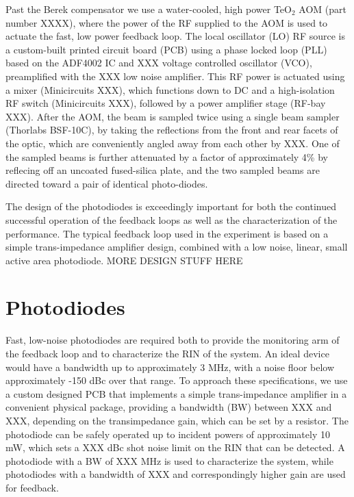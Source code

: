 \documentclass[twocolumn,aps,pra,showpacs,preprintnumbers,bibnotes]{revtex4-1}
\begin{document}
Past the Berek compensator we use a water-cooled, high power TeO$_2$ AOM (part number XXXX), where the power of the RF supplied to the AOM is used to actuate the fast, low power feedback loop.
The local oscillator (LO) RF source is a custom-built printed circuit board (PCB) using a phase locked loop (PLL) based on the ADF4002 IC and XXX voltage controlled oscillator (VCO), preamplified with the XXX low noise amplifier. 
This RF power is actuated using a mixer (Minicircuits XXX), which functions down to DC and a high-isolation RF switch (Minicircuits XXX), followed by a power amplifier stage (RF-bay XXX). After the AOM, the beam is sampled twice using a single beam sampler (Thorlabs BSF-10C), by taking the reflections from the front and rear facets of the optic, which are conveniently angled away from each other by XXX.
One of the sampled beams is further attenuated by a factor of approximately 4\% by reflecing off an uncoated fused-silica plate, and the two sampled beams are directed toward a pair of identical photo-diodes. 

The design of the photodiodes is exceedingly important for both the continued successful operation of the feedback loops as well as the characterization of the performance. The typical feedback loop used in the experiment is based on a simple trans-impedance amplifier design, combined with a low noise, linear, small active area photodiode. MORE DESIGN STUFF HERE



\section{Photodiodes}
Fast, low-noise photodiodes are required both to provide the monitoring arm of the feedback loop and to characterize the RIN of the system.
An ideal device would have a bandwidth up to approximately 3 MHz, with a noise floor below approximately -150 dBc over that range.
To approach these specifications, we use a custom designed PCB that implements a simple trans-impedance amplifier in a convenient physical package, providing a bandwidth (BW) between XXX and XXX, depending on the transimpedance gain, which can be set by a resistor. 
The photodiode can be safely operated up to incident powers of approximately 10 mW, which sets a XXX dBc shot noise limit on the RIN that can be detected.
A photodiode with a BW of XXX MHz is used to characterize the system, while photodiodes with a bandwidth of XXX and correspondingly higher gain are used for feedback.
\end{document}
